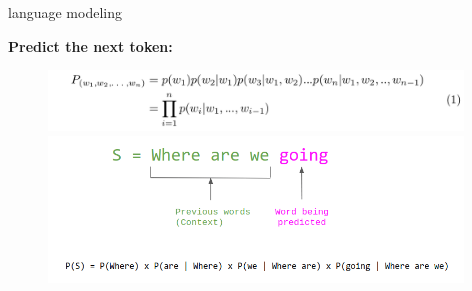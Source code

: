 
\begin{vbframe}{language modeling}
	
\vfill

\textbf{Predict the next token:}

\begin{figure}
	\centering
		\includegraphics[width = 11cm]{figure/language-modeling.png}\\ 
		\includegraphics[width = 11cm]{figure/language-modeling2.png}\\
\end{figure}

\vfill

\end{vbframe}


